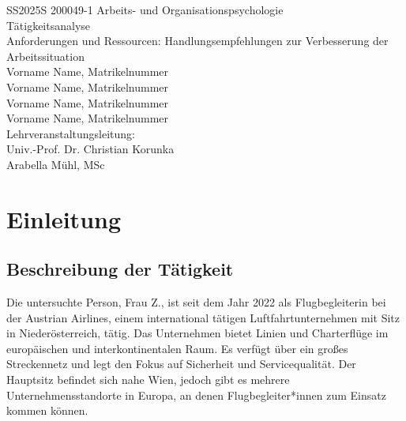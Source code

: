 \documentclass[12pt, a4paper]{article}
\begin{document}
\begin{titlepage}
    \begin{center}
        \large SS2025S 200049-1 Arbeits- und Organisationspsychologie \\
        \vspace{1in}
        \Large Tätigkeitsanalyse \\
        \LARGE Anforderungen und Ressourcen:
        Handlungsempfehlungen zur Verbesserung der
        Arbeitssituation \\
        \vspace*{1in}
        \large 
        Vorname Name, Matrikelnummer \\
        Vorname Name, Matrikelnummer \\
        Vorname Name, Matrikelnummer \\
        Vorname Name, Matrikelnummer \\
        \vfill
        Lehrveranstaltungsleitung: \\
        Univ.-Prof. Dr. Christian Korunka \\
        Arabella Mühl, MSc \\
        \vspace{1in}   
    \end{center}
\end{titlepage}

\tableofcontents

\newpage

\section{Einleitung}

\subsection{Beschreibung der Tätigkeit}


Die untersuchte Person, Frau Z., ist seit dem Jahr 2022 als Flugbegleiterin bei der Austrian Airlines, 
einem international tätigen Luftfahrtunternehmen mit Sitz in Niederösterreich, 
tätig. Das Unternehmen bietet Linien und Charterflüge im europäischen und interkontinentalen Raum. 
Es verfügt über ein großes Streckennetz und legt den Fokus auf Sicherheit und Servicequalität. 
Der Hauptsitz befindet sich nahe Wien, jedoch gibt es mehrere Unternehmensstandorte in Europa, an denen Flugbegleiter*innen zum Einsatz kommen können.
\end{document}
